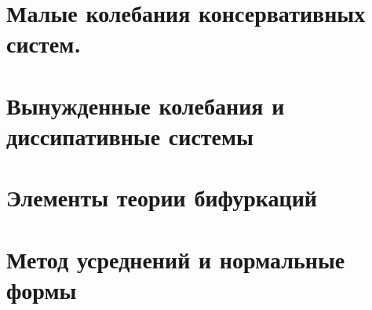 


\section{Малые колебания консервативных систем.}

% 

\section{Вынужденные колебания и диссипативные системы}


\section{Элементы теории бифуркаций}


\section{Метод усреднений и нормальные формы}

